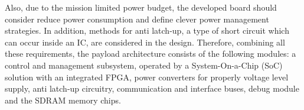 
Also, due to the mission limited power budget, the developed board should consider reduce power consumption and define clever power management strategies. In addition, methods for anti latch-up, a type of short circuit which can occur inside an IC, are considered in the design. Therefore, combining all these requirements, the payload architecture consists of the following modules: a control and management subsystem, operated by a System-On-a-Chip (SoC) solution with an integrated FPGA, power converters for properly voltage level supply, anti latch-up circuitry, communication and interface buses, debug module and the SDRAM memory chips.

